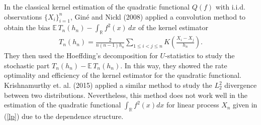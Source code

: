 \documentclass[11pt]{article}
\def\R{{\mathbb R}}
\def\E{{{\mathbb E}\,}}
\begin{document}
In the classical kernel estimation of the quadratic functional $Q(f)$ with i.i.d. observations $\{X_i\}_{i=1}^n$, Gin\'{e} and Nickl (2008) applied a convolution method  to
obtain the bias $\E T_n(h_n)-\int_{\R} f^2(x)\,dx$ of the kernel estimator 
\begin{align}\label{kernel}
T_n(h_n)=\frac{2}{n(n-1)h_n} \sum_{1\le i<j\le n}K\left(\frac{X_i-X_j}{h_n}\right).
\end{align}
They then used the Hoeffding's decomposition for $U$-statistics to study the stochastic part  $T_n(h_n)-\E T_n(h_n)$. In this way, they showed the rate optimality and efficiency of the kernel estimator for the quadratic functional. Krishnamurthy et. al. (2015) applied a similar method to study the $L^2_2$ divergence between two distributions. Nevertheless, this method does not work well in the estimation of the quadratic functional $\int_{\R} f^2(x)dx$ for linear process $X_n$ given in (\ref{lp}) due to the dependence structure. 
\end{document}
